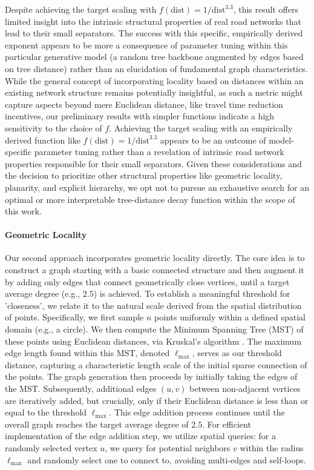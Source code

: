 Despite achieving the target scaling with \(f(\text{dist}) = 1/\text{dist}^{3.3}\), this result offers limited insight into the intrinsic structural properties of real road networks that lead to their small separators.
The success with this specific, empirically derived exponent appears to be more a consequence of parameter tuning within this particular generative model (a random tree backbone augmented by edges based on tree distance) rather than an elucidation of fundamental graph characteristics.
While the general concept of incorporating locality based on distances within an existing network structure remains potentially insightful, as such a metric might capture aspects beyond mere Euclidean distance, like travel time reduction incentives, our preliminary results with simpler functions indicate a high sensitivity to the choice of \(f\).
Achieving the target  scaling with an empirically derived function like \(f(\text{dist}) = 1/\text{dist}^{3.3}\) appears to be an outcome of model-specific parameter tuning rather than a revelation of intrinsic road network properties responsible for their small separators.
Given these considerations and the decision to prioritize other structural properties like geometric locality, planarity, and explicit hierarchy, we opt not to pursue an exhaustive search for an optimal or more interpretable tree-distance decay function within the scope of this work.


\paragraph{Geometric Locality}

Our second approach incorporates geometric locality directly.
The core idea is to construct a graph starting with a basic connected structure and then augment it by adding only edges that connect geometrically close vertices, until a target average degree (e.g., \(2.5\)) is achieved.
To establish a meaningful threshold for 'closeness', we relate it to the natural scale derived from the spatial distribution of points.
Specifically, we first sample \(n\) points uniformly within a defined spatial domain (e.g., a circle).
We then compute the Minimum Spanning Tree (MST) of these points using Euclidean distances, via Kruskal's algorithm \cite{kruskal_shortest_1956}.
The maximum edge length found within this MST, denoted \(\ell_{\max}\), serves as our threshold distance, capturing a characteristic length scale of the initial sparse connection of the points.
The graph generation then proceeds by initially taking the edges of the MST.
Subsequently, additional edges \((u, v)\) between non-adjacent vertices are iteratively added, but crucially, only if their Euclidean distance is less than or equal to the threshold \(\ell_{\max}\).
This edge addition process continues until the overall graph reaches the target average degree of \(2.5\).
For efficient implementation of the edge addition step, we utilize spatial queries: for a randomly selected vertex \(u\), we query for potential neighbors \(v\) within the radius \(\ell_{\max}\) and randomly select one to connect to, avoiding multi-edges and self-loops.

